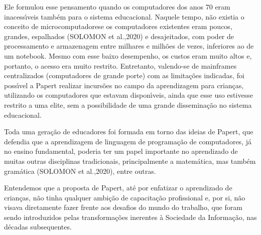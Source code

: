 \documentclass[
12pt,		%
openright,	%
twoside,  %
a4paper,			%
chapter=TITLE,		%
english,			%
french,				%
spanish,			%
brazil				%
]{USPSC-classe/USPSC}
\begin{document}
Ele formulou esse pensamento quando os computadores dos anos 70 eram inacess\'{\i}veis tamb\'em para o sistema educacional. Naquele tempo, n\~ao existia o conceito de \textquotedbl microcomputadores\textquotedbl  e os computadores existentes eram poucos, grandes, espalhados  (SOLOMON et al.,2020) e desajeitados, com poder de processamento e armazenagem entre milhares e milh\~oes de vezes, inferiores ao de um notebook. Mesmo com esse baixo desempenho, os custos eram muito altos e, portanto, o acesso era muito restrito. Entretanto, valendo-se de mainframes centralizados (computadores de grande porte) com as limita\c{c}\~oes indicadas, foi poss\'{\i}vel a Papert realizar incurs\~oes no campo da aprendizagem para crian\c{c}as, utilizando os computadores que estavam dispon\'{\i}veis, ainda que esse uso estivesse restrito a uma elite, sem a possibilidade de uma grande dissemina\c{c}\~ao no sistema educacional.

















Toda uma gera\c{c}\~ao de educadores foi formada em torno das ideias de Papert, que defendia que a aprendizagem de linguagem de programa\c{c}\~ao de computadores, j\'a no ensino fundamental, poderia ter um papel importante no aprendizado de muitas outras disciplinas tradicionais, principalmente a matem\'atica, mas tamb\'em gram\'atica (SOLOMON et al.,2020), entre outras.

















Entendemos que a proposta de Papert, at\'e por enfatizar o aprendizado de crian\c{c}as, n\~ao tinha qualquer ambi\c{c}\~ao de capacita\c{c}\~ao profissional e, por si, n\~ao visava diretamente fazer frente aos desafios do \textquotedbl mundo do trabalho\textquotedbl , que foram sendo introduzidos pelas transforma\c{c}\~oes inerentes \`a Sociedade da Informa\c{c}\~ao, nas d\'ecadas subsequentes.
\end{document}
